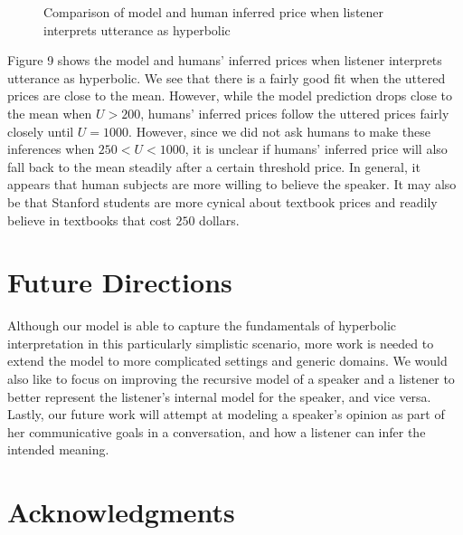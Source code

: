 \documentclass{article} %
\begin{document}
\begin{figure}[tl]
\caption{Comparison of model and human inferred price when listener interprets utterance as hyperbolic}
\end{figure}

Figure 9 shows the model and humans' inferred prices when listener interprets utterance as hyperbolic. We see that there is a fairly good fit when the uttered prices are close to the mean. However, while the model prediction drops close to the mean when $U > 200$, humans' inferred prices follow the uttered prices fairly closely until $U = 1000$. However, since we did not ask humans to make these inferences when $ 250 < U < 1000$, it is unclear if humans' inferred price will also fall back to the mean steadily after a certain threshold price. In general, it appears that human subjects are more willing to believe the speaker. It may also be that Stanford students are more cynical about textbook prices and readily believe in textbooks that cost $250$ dollars.


\section{Future Directions}
Although our model is able to capture the fundamentals of hyperbolic interpretation in this particularly simplistic scenario, more work is needed to extend the model to more complicated settings and generic domains. We would also like to focus on improving the recursive model of a speaker and a listener to better represent the listener's internal model for the speaker, and vice versa. Lastly, our future work will attempt at modeling a speaker's opinion as part of her communicative goals in a conversation, and how a listener can infer the intended meaning.

\section{Acknowledgments}





\setlength{\bibleftmargin}{.125in}
\setlength{\bibindent}{-\bibleftmargin}


\end{document}
